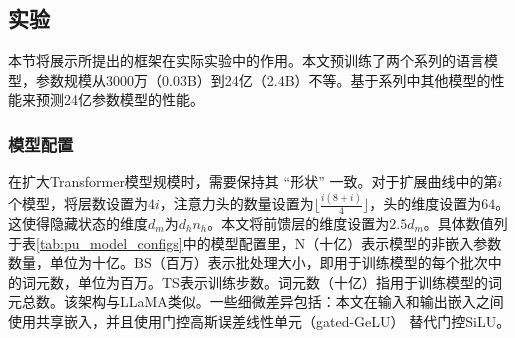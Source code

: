 \subsection{实验}

本节将展示所提出的框架在实际实验中的作用。本文预训练了两个系列的语言模型，参数规模从3000万（0.03B）到24亿（2.4B）不等。基于系列中其他模型的性能来预测24亿参数模型的性能。

\label{sec:train}
\subsubsection{模型配置}
在扩大Transformer模型规模时，需要保持其 “形状” 一致。对于扩展曲线中的第\(i\)个模型，将层数设置为\(4i\)，注意力头的数量设置为\(\lfloor \frac{i(8 + i)}{4} \rfloor\)，头的维度设置为\(64\)。这使得隐藏状态的维度\(d_m\)为\(d_hn_h\)。本文将前馈层的维度设置为\(2.5d_m\)。具体数值列于表\ref{tab:pu_model_configs}中的模型配置里，N（十亿）表示模型的非嵌入参数数量，单位为十亿。BS（百万）表示批处理大小，即用于训练模型的每个批次中的词元数，单位为百万。TS表示训练步数。词元数（十亿）指用于训练模型的词元总数。该架构与LLaMA类似\citep{touvron2023llama}。一些细微差异包括：本文在输入和输出嵌入之间使用共享嵌入，并且使用门控高斯误差线性单元（gated-GeLU）\citep{hendrycks2016gaussian} 替代门控SiLU\citep{DBLP:journals/corr/abs-2002-05202}。

\begin{table}[htbp]
    \centering
    \caption{扩展曲线中各模型的模型配置和训练配置}
    \label{tab:pu_model_configs}
\end{table}



